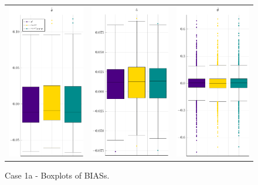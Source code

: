 \begin{figure}[ht]
	\centering \begin{tabular}[b]{c c c}
		\includegraphics[width=.3\textwidth]{Figures/1a/BIAS_b.pdf} & \includegraphics[width=.3\textwidth]{Figures/1a/BIAS_a.pdf} & \includegraphics[width=.3\textwidth]{Figures/1a/BIAS_t.pdf}
	\end{tabular}
	\caption{Case 1a - Boxplots of BIASs.}
	\label{fig:bpBIAS1a}
\end{figure}

